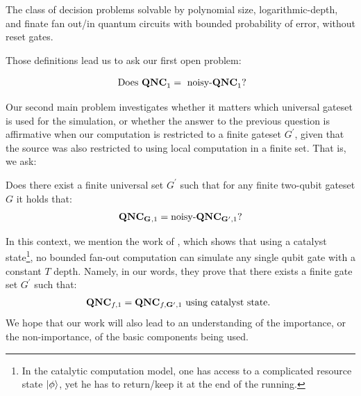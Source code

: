 \documentclass[manuscript,screen,review]{acmart}
\begin{document}
{\begin{definition}
  The class of decision problems solvable by polynomial size,  logarithmic-depth, and finate fan out/in quantum circuits with bounded probability of error, without reset gates.
\end{definition}
Those definitions lead us to ask our first open problem:
\begin{oproblem}
\begin{equation*}
  \begin{split}
    \text{ Does }  \mathbf{QNC}_{1}{} = \text{ noisy-}\mathbf{QNC}_{1}{} \text{?}
  \end{split}
\end{equation*}
\end{oproblem}
Our second main problem investigates whether it matters which universal gateset is used for the simulation, or whether the answer to the previous question is affirmative when our computation is restricted to a finite gateset $G^{\prime}$, given that the source was also restricted to using local computation in a finite set. That is, we ask: \begin{oproblem}
  Does there exist a finite universal set $G^{\prime}$ such that for any finite two-qubit gateset $G$ it holds that:
\begin{equation*}
  \begin{split}
\mathbf{QNC_G}{}_{,1} = \text{noisy-}\mathbf{QNC}{}_{\mathbf{G^{\prime}}, 1} \text{?}
  \end{split}
\end{equation*}
\end{oproblem}

In this context, we mention the work of \cite{kim2025catalyticzrotationsconstanttdepth}, which shows that using a catalyst state\footnote{In the catalytic computation model, one has access to a complicated resource state $\ket{\phi}$, yet he has to return/keep it at the end of the running.}, no bounded fan-out computation can simulate any single qubit gate with a constant $T$ depth. Namely, in our words, they prove that there exists a finite gate set $G^{\prime}$ such that:
\begin{equation*}
  \begin{split}
    \mathbf{QNC}{}_{f,1} = \mathbf{QNC}{}_{f, \mathbf{G^{\prime}}, 1} \text{ using catalyst state. }
  \end{split}
\end{equation*}
We hope that our work will also lead to an understanding of the importance, or the non-importance, of the basic components being used.

}
\end{document}
